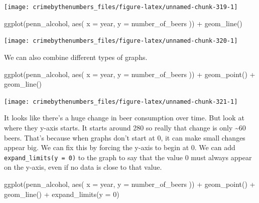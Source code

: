 \documentclass[
]{krantz}
\makeatletter
\newenvironment{Shaded}{\begin{snugshade}}{\end{snugshade}}
\newcommand{\AttributeTok}[1]{\textcolor[rgb]{0.61,0.61,0.61}{#1}}
\newcommand{\DecValTok}[1]{\textcolor[rgb]{0.06,0.06,0.06}{#1}}
\newcommand{\FunctionTok}[1]{\textcolor[rgb]{0,0,0}{#1}}
\newcommand{\NormalTok}[1]{#1}
\newcommand{\SpecialCharTok}[1]{\textcolor[rgb]{0,0,0}{#1}}
\newenvironment{kframe}{%
\medskip{}
\setlength{\fboxsep}{.8em}
 \def\at@end@of@kframe{}%
 \ifinner\ifhmode%
  \def\at@end@of@kframe{\end{minipage}}%
  \begin{minipage}{\columnwidth}%
 \fi\fi%
 \def\FrameCommand##1{\hskip\@totalleftmargin \hskip-\fboxsep
 \colorbox{shadecolor}{##1}\hskip-\fboxsep
     \hskip-\linewidth \hskip-\@totalleftmargin \hskip\columnwidth}%
 \MakeFramed {\advance\hsize-\width
   \@totalleftmargin\z@ \linewidth\hsize
   \@setminipage}}%
 {\par\unskip\endMakeFramed%
 \at@end@of@kframe}
\renewenvironment{Shaded}{\begin{kframe}}{\end{kframe}}
\makeatother
\begin{document}
\begin{center}\texttt{[image: crimebythenumbers\_files/figure-latex/unnamed-chunk-319-1]} \end{center}

\begin{Shaded}
\begin{Highlighting}[]
\FunctionTok{ggplot}\NormalTok{(penn\_alcohol, }\FunctionTok{aes}\NormalTok{(}
  \AttributeTok{x =}\NormalTok{ year,}
  \AttributeTok{y =}\NormalTok{ number\_of\_beers}
\NormalTok{)) }\SpecialCharTok{+}
  \FunctionTok{geom\_line}\NormalTok{()}
\end{Highlighting}
\end{Shaded}

\begin{center}\texttt{[image: crimebythenumbers\_files/figure-latex/unnamed-chunk-320-1]} \end{center}

We can also combine different types of graphs.

\begin{Shaded}
\begin{Highlighting}[]
\FunctionTok{ggplot}\NormalTok{(penn\_alcohol, }\FunctionTok{aes}\NormalTok{(}
  \AttributeTok{x =}\NormalTok{ year,}
  \AttributeTok{y =}\NormalTok{ number\_of\_beers}
\NormalTok{)) }\SpecialCharTok{+}
  \FunctionTok{geom\_point}\NormalTok{() }\SpecialCharTok{+}
  \FunctionTok{geom\_line}\NormalTok{()}
\end{Highlighting}
\end{Shaded}

\begin{center}\texttt{[image: crimebythenumbers\_files/figure-latex/unnamed-chunk-321-1]} \end{center}

It looks like there's a huge change in beer consumption over
time. But look at where they y-axis starts. It starts around
280 so really that change is only \textasciitilde60 beers.
That's because when graphs don't start at 0, it can make
small changes appear big. We can fix this by forcing the
y-axis to begin at 0. We can add
\texttt{expand\_limits(y\ =\ 0)} to the graph to say that
the value 0 must always appear on the y-axis, even if no
data is close to that value.

\begin{Shaded}
\begin{Highlighting}[]
\FunctionTok{ggplot}\NormalTok{(penn\_alcohol, }\FunctionTok{aes}\NormalTok{(}
  \AttributeTok{x =}\NormalTok{ year,}
  \AttributeTok{y =}\NormalTok{ number\_of\_beers}
\NormalTok{)) }\SpecialCharTok{+}
  \FunctionTok{geom\_point}\NormalTok{() }\SpecialCharTok{+}
  \FunctionTok{geom\_line}\NormalTok{() }\SpecialCharTok{+}
  \FunctionTok{expand\_limits}\NormalTok{(}\AttributeTok{y =} \DecValTok{0}\NormalTok{)}
\end{Highlighting}
\end{Shaded}
\end{document}
